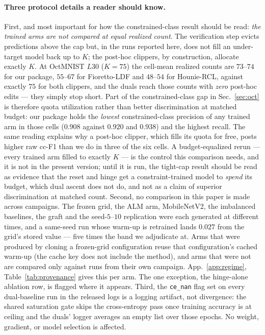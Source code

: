 \documentclass[10pt]{article}
\begin{document}
{\color{blue}
\paragraph{Three protocol details a reader should know.}
First, and most important for how the constrained-class result should be read:
\emph{the trained arms are not compared at equal realized count}. The verification
step evicts predictions above the cap but, in the runs reported here, does not fill
an under-target model back up to $K$; the post-hoc clippers, by construction,
allocate exactly $K$. At OctMNIST $L30$ ($K{=}75$) the cell-mean realized counts are
$73$--$74$ for our package, $55$--$67$ for Fioretto-LDF and $48$--$54$ for
Hounie-RCL, against exactly $75$ for both clippers, and the duals reach those counts
with \emph{zero} post-hoc edits --- they simply stop short. Part of the
constrained-class gap in Sec.~\ref{sec:oct} is therefore quota utilization rather
than better discrimination at matched budget: our package holds the \emph{lowest}
constrained-class precision of any trained arm in those cells ($0.908$ against
$0.920$ and $0.938$) and the highest recall. The same reading explains why a
post-hoc clipper, which fills its quota for free, posts higher raw cc-F1 than we do
in three of the six cells. A budget-equalized rerun --- every trained arm filled to
exactly $K$ --- is the control this comparison needs, and it is not in the present
version; until it is run, the tight-cap result should be read as evidence that the
reset and hinge get a constraint-trained model to \emph{spend} its budget, which
dual ascent does not do, and not as a claim of superior discrimination at matched
count.
Second, no comparison in this paper is made across campaigns. The frozen grid,
the ALM arm, MobileNetV2, the imbalanced baselines, the graft and the
seed-$5$--$10$ replication were each generated at different times, and a
same-seed run whose warm-up is retrained lands $0.027$ from the grid's stored
value --- five times the band we adjudicate at. Arms that were produced by
cloning a frozen-grid configuration reuse that configuration's cached warm-up
(the cache key does not include the method), and arms that were not are compared
only against runs from their own campaign. App.~\ref{app:regime},
Table~\ref{tab:provenance} gives this per arm. The one exception, the
hinge-alone ablation row, is flagged where it appears.
Third, the \texttt{ce\_nan} flag set on every dual-baseline run in the released
logs is a logging artifact, not divergence: the shared saturation gate skips the
cross-entropy pass once training accuracy is at ceiling and the duals' logger
averages an empty list over those epochs. No weight, gradient, or model selection
is affected.
}
\end{document}
